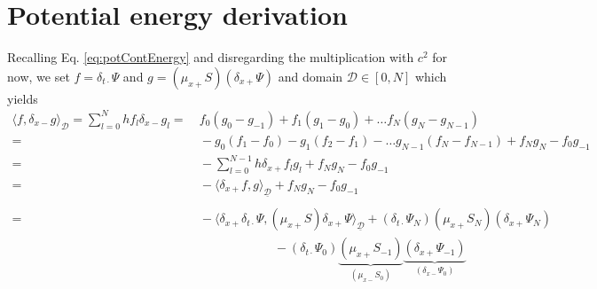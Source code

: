\documentclass[dvipsnames]{article}
\def\dxp{\delta_{x+}}
\def\dxm{\delta_{x-}}
\def\mup{\mu_{x+}}
\def\mum{\mu_{x-}}
\def\dtd{\delta_{t\cdot}}
\begin{document}
\section{Potential energy derivation}\label{app:potDeriv}
Recalling Eq. \eqref{eq:potContEnergy} and disregarding the multiplication with $c^2$ for now, we set $f=\dtd\Psi$ and $g = (\mup S)(\dxp \Psi)$ and domain $\mathcal{D} \in [0,N]$ which yields
\begin{align}
    \langle f, \dxm g\rangle_\mathcal{D} = \sum_{l=0}^N hf_l\dxm g_l =&\  f_0(g_0-g_{-1}) + f_1(g_1-g_0) + \hdots f_N(g_N-g_{N-1}) \nonumber\\
    =&\ - g_0(f_1-f_0) - g_1(f_2-f_1) - \hdots g_{N-1}(f_N-f_{N-1})  + f_Ng_N - f_0g_{-1}\nonumber\\
    =&\  -\sum_{l=0}^{N-1}h\dxp f_lg_l + f_Ng_N - f_0g_{-1}\nonumber\\
    =&\  -\langle\dxp f,  g\rangle_\mathcal{\underline{D}} + f_Ng_N - f_0g_{-1}\nonumber\\
    &\nonumber \\
    = &\ -\langle\dxp\dtd\Psi,(\mup S) \dxp\Psi\rangle_{\underline{\mathcal{D}}} + (\dtd\Psi_N)(\mup S_N)(\dxp\Psi_N) \nonumber\\
    &\ \qquad\qquad\qquad- (\dtd\Psi_0)\underbrace{(\mup S_{-1})}_{(\mum S_0)}\underbrace{(\dxp\Psi_{-1})}_{(\dxm \Psi_0)}
\end{align} 
\end{document}
